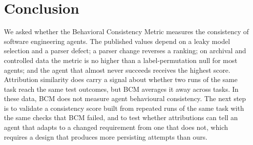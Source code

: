 \documentclass[conference]{IEEEtran}
\newcommand{\bcm}{\textsc{BCM}}
\begin{document}
\section{Conclusion}
\label{sec:conclusion}
We asked whether the Behavioral Consistency Metric measures the consistency of software engineering agents. The published values depend on a leaky model selection and a parser defect; a parser change reverses a ranking; on archival and controlled data the metric is no higher than a label-permutation null for most agents; and the agent that almost never succeeds receives the highest score. Attribution similarity does carry a signal about whether two runs of the same task reach the same test outcomes, but \bcm{} averages it away across tasks. In these data, \bcm{} does not measure agent behavioural consistency. The next step is to validate a consistency score built from repeated runs of the same task with the same checks that \bcm{} failed, and to test whether attributions can tell an agent that adapts to a changed requirement from one that does not, which requires a design that produces more persisting attempts than ours.



\end{document}
